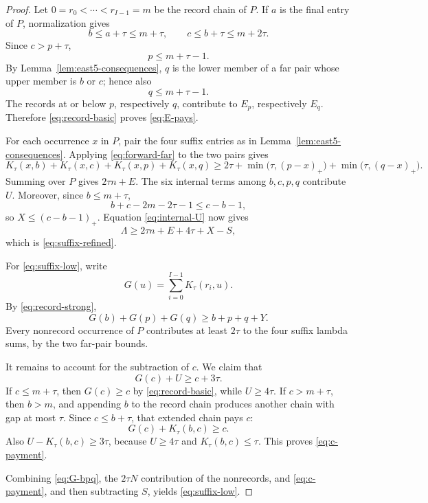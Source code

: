 \documentclass[11pt]{article}
\theoremstyle{definition}
\theoremstyle{remark}
\begin{document}
\begin{proof}
Let \(0=r_0<\cdots<r_{I-1}=m\) be the record chain of \(P\).  If
\(a\) is the final entry of \(P\), normalization gives
\[
  b\le a+\tau\le m+\tau,
  \qquad c\le b+\tau\le m+2\tau.
\]
Since \(c>p+\tau\),
\[
  p\le m+\tau-1.
\]
By Lemma~\ref{lem:east5-consequences}, \(q\) is the lower member of a
far pair whose upper member is \(b\) or \(c\); hence also
\[
  q\le m+\tau-1.
\]
The records at or below \(p\), respectively \(q\), contribute to
\(E_p\), respectively \(E_q\).  Therefore
\eqref{eq:record-basic} proves \eqref{eq:E-pays}.

For each occurrence \(x\) in \(P\), pair the four suffix entries as in
Lemma~\ref{lem:east5-consequences}.  Applying
\eqref{eq:forward-far} to the two pairs gives
\[
  K_\tau(x,b)+K_\tau(x,c)+K_\tau(x,p)+K_\tau(x,q)
  \ge2\tau+
  \min\bigl(\tau,(p-x)_+\bigr)+
  \min\bigl(\tau,(q-x)_+\bigr).
\]
Summing over \(P\) gives \(2\tau n+E\).  The six internal terms among
\(b,c,p,q\) contribute \(U\).  Moreover, since \(b\le m+\tau\),
\[
  b+c-2m-2\tau-1\le c-b-1,
\]
so \(X\le(c-b-1)_+\).  Equation \eqref{eq:internal-U} now gives
\[
  \Lambda\ge2\tau n+E+4\tau+X-S,
\]
which is \eqref{eq:suffix-refined}.

For \eqref{eq:suffix-low}, write
\[
  G(u)=\sum_{i=0}^{I-1}K_\tau(r_i,u).
\]
By \eqref{eq:record-strong},
\begin{equation}
  G(b)+G(p)+G(q)\ge b+p+q+Y.
  \label{eq:G-bpq}
\end{equation}
Every nonrecord occurrence of \(P\) contributes at least \(2\tau\) to
the four suffix lambda sums, by the two far-pair bounds.

It remains to account for the subtraction of \(c\).  We claim that
\begin{equation}
  G(c)+U\ge c+3\tau.
  \label{eq:c-payment}
\end{equation}
If \(c\le m+\tau\), then \(G(c)\ge c\) by
\eqref{eq:record-basic}, while \(U\ge4\tau\).  If
\(c>m+\tau\), then \(b>m\), and appending \(b\) to the record chain
produces another chain with gap at most \(\tau\).  Since \(c\le b+\tau\),
that extended chain pays \(c\):
\[
  G(c)+K_\tau(b,c)\ge c.
\]
Also \(U-K_\tau(b,c)\ge3\tau\), because \(U\ge4\tau\) and
\(K_\tau(b,c)\le\tau\).  This proves \eqref{eq:c-payment}.

Combining \eqref{eq:G-bpq}, the \(2\tau N\) contribution of the
nonrecords, and \eqref{eq:c-payment}, and then subtracting \(S\), yields
\eqref{eq:suffix-low}.
\end{proof}
\end{document}
